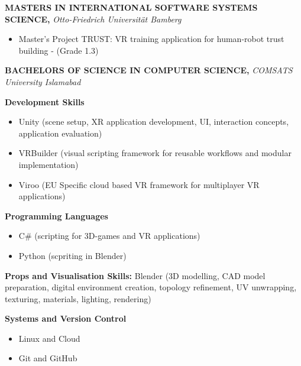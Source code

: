 \documentclass[10.5pt,a4paper]{article}
\begin{document}
\small\textbf{MASTERS IN INTERNATIONAL SOFTWARE SYSTEMS SCIENCE,} \textit{\small Otto-Friedrich Universität Bamberg}
\begin{itemize}
  \small
  \item Master's Project TRUST: VR training application for human-robot trust building - (Grade 1.3)
\end{itemize}
\entryend

\small\textbf{BACHELORS OF SCIENCE IN COMPUTER SCIENCE,} \textit{COMSATS University Islamabad}
\entryend

\newpage
{}

\small\textbf{Development Skills}
\begin{itemize}
  \small
  \item Unity (scene setup, XR application development, UI, interaction concepts, application evaluation)
  \item VRBuilder (visual scripting framework for reusable workflows and modular implementation)
  \item Viroo (EU Specific cloud based VR framework for multiplayer VR applications)
\end{itemize}

\vspace{3pt}
\small\textbf{Programming Languages}
\begin{itemize}
  \small
  \item C\# (scripting for 3D-games and VR applications)
  \item Python (scpriting in Blender)
\end{itemize}

\vspace{3pt}
\small\textbf{Props and Visualisation Skills:} Blender (3D modelling, CAD model preparation, digital environment creation, topology refinement, UV unwrapping, texturing, materials, lighting, rendering)

\vspace{3pt}
\small\textbf{Systems and Version Control}
\begin{itemize}
  \small
  \item Linux and Cloud
  \item Git and GitHub
\end{itemize}

\end{document}
